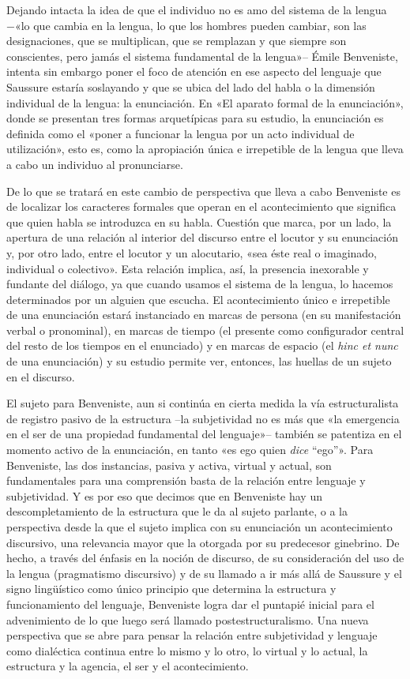 Dejando intacta la idea de que el individuo no es amo del sistema de la lengua −«lo que cambia en la lengua, lo que los hombres pueden cambiar, son las designaciones, que se multiplican, que se remplazan y que siempre son conscientes, pero jamás el sistema fundamental de la lengua»-- Émile Benveniste, intenta sin embargo poner el foco de atención en ese aspecto del lenguaje que Saussure estaría soslayando y que se ubica del lado del habla o la dimensión individual de la lengua: la enunciación. En «El aparato formal de la enunciación», donde se presentan tres formas arquetípicas para su estudio, la enunciación es definida como el «poner a funcionar la lengua por un acto individual de utilización», esto es, como la apropiación única e irrepetible de la lengua que lleva a cabo un individuo al pronunciarse.

De lo que se tratará en este cambio de perspectiva que lleva a cabo Benveniste es de localizar los caracteres formales que operan en el acontecimiento que significa que quien habla se introduzca en su habla. Cuestión que marca, por un lado, la apertura de una relación al interior del discurso entre el locutor y su enunciación y, por otro lado, entre el locutor y un alocutario, «sea éste real o imaginado, individual o colectivo». Esta relación implica, así, la presencia inexorable y fundante del diálogo, ya que cuando usamos el sistema de la lengua, lo hacemos determinados por un alguien que escucha. El acontecimiento único e irrepetible de una enunciación estará instanciado en marcas de persona (en su manifestación verbal o pronominal), en marcas de tiempo (el presente como configurador central del resto de los tiempos en el enunciado) y en marcas de espacio (el \emph{hinc et nunc} de una enunciación) y su estudio permite ver, entonces, las huellas de un sujeto en el discurso.

El sujeto para Benveniste, aun si continúa en cierta medida la vía estructuralista de registro pasivo de la estructura --la subjetividad no es más que «la emergencia en el ser de una propiedad fundamental del lenguaje»-- también se patentiza en el momento activo de la enunciación, en tanto «es ego quien \emph{dice} ``ego''». Para Benveniste, las dos instancias, pasiva y activa, virtual y actual, son fundamentales para una comprensión basta de la relación entre lenguaje y subjetividad. Y es por eso que decimos que en Benveniste hay un descompletamiento de la estructura que le da al sujeto parlante, o a la perspectiva desde la que el sujeto implica con su enunciación un acontecimiento discursivo, una relevancia mayor que la otorgada por su predecesor ginebrino. De hecho, a través del énfasis en la noción de discurso, de su consideración del uso de la lengua (pragmatismo discursivo) y de su llamado a ir más allá de Saussure y el signo lingüístico como único principio que determina la estructura y funcionamiento del lenguaje, Benveniste logra dar el puntapié inicial para el advenimiento de lo que luego será llamado postestructuralismo. Una nueva perspectiva que se abre para pensar la relación entre subjetividad y lenguaje como dialéctica continua entre lo mismo y lo otro, lo virtual y lo actual, la estructura y la agencia, el ser y el acontecimiento.


